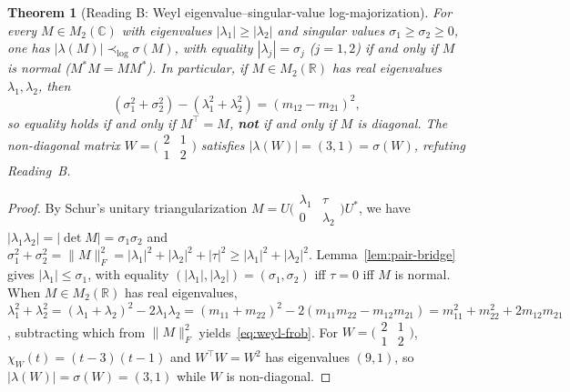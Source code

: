 \documentclass[11pt,a4paper]{article}
\newtheorem{theorem}{Theorem}[section]
\theoremstyle{definition}
\newcommand{\R}{\mathbb{R}}
\newcommand{\C}{\mathbb{C}}
\begin{document}
\begin{theorem}[Reading B: Weyl eigenvalue--singular-value log-majorization]\label{thm:weyl}
For every $M \in M_2(\C)$ with eigenvalues $|\lambda_1| \ge |\lambda_2|$ and singular values $\sigma_1 \ge \sigma_2 \ge 0$, one has $|\lambda(M)| \prec_{\log} \sigma(M)$, with equality $|\lambda_j| = \sigma_j$ ($j = 1, 2$) if and only if $M$ is normal ($M^* M = M M^*$). In particular, if $M \in M_2(\R)$ has real eigenvalues $\lambda_1, \lambda_2$, then
\begin{equation}\label{eq:weyl-frob}
  (\sigma_1^2 + \sigma_2^2) - (\lambda_1^2 + \lambda_2^2) = (m_{12} - m_{21})^2,
\end{equation}
so equality holds if and only if $M^\top = M$, \textbf{not} if and only if $M$ is diagonal. The non-diagonal matrix $W = \bigl(\begin{smallmatrix} 2 & 1 \\ 1 & 2 \end{smallmatrix}\bigr)$ satisfies $|\lambda(W)| = (3, 1) = \sigma(W)$, refuting Reading~B.
\end{theorem}

\begin{proof}
By Schur's unitary triangularization $M = U \bigl(\begin{smallmatrix} \lambda_1 & \tau \\ 0 & \lambda_2 \end{smallmatrix}\bigr) U^*$, we have $|\lambda_1 \lambda_2| = |\det M| = \sigma_1 \sigma_2$ and $\sigma_1^2 + \sigma_2^2 = \|M\|_F^2 = |\lambda_1|^2 + |\lambda_2|^2 + |\tau|^2 \ge |\lambda_1|^2 + |\lambda_2|^2$. Lemma~\ref{lem:pair-bridge} gives $|\lambda_1| \le \sigma_1$, with equality $(|\lambda_1|, |\lambda_2|) = (\sigma_1, \sigma_2)$ iff $\tau = 0$ iff $M$ is normal. When $M \in M_2(\R)$ has real eigenvalues, $\lambda_1^2 + \lambda_2^2 = (\lambda_1 + \lambda_2)^2 - 2\lambda_1\lambda_2 = (m_{11} + m_{22})^2 - 2(m_{11}m_{22} - m_{12}m_{21}) = m_{11}^2 + m_{22}^2 + 2 m_{12} m_{21}$, subtracting which from $\|M\|_F^2$ yields~\eqref{eq:weyl-frob}. For $W = \bigl(\begin{smallmatrix} 2 & 1 \\ 1 & 2 \end{smallmatrix}\bigr)$, $\chi_W(t) = (t-3)(t-1)$ and $W^\top W = W^2$ has eigenvalues $(9, 1)$, so $|\lambda(W)| = \sigma(W) = (3, 1)$ while $W$ is non-diagonal.
\end{proof}
\end{document}
